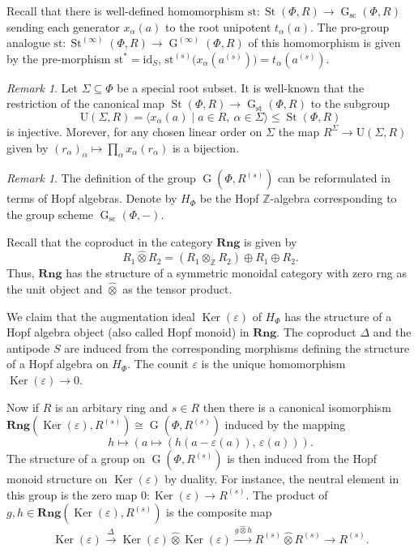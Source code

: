 \documentclass[oneside, 11pt]{amsart}
\numberwithin{equation}{section}
\theoremstyle{definition}
\theoremstyle{remark}
\newtheorem{rem}[lemma]{Remark}
\DeclareMathOperator\St{St}
\DeclareMathOperator\Ker{Ker}
\DeclareMathOperator\GG{G}
\newcommand{\Rng}{\mathbf{Rng}}
\newcommand{\ZZ}{\mathbb{Z}}
\newcommand{\otimeshat}{\mathbin{\widehat{\otimes}}}
\begin{document}
Recall that there is well-defined homomorphism $\mathrm{st}\colon \St(\Phi, R) \to \GG_{\mathrm{sc}}(\Phi, R)$ sending each generator $x_\alpha(a)$ to the root unipotent $t_\alpha(a)$. The pro-group analogue \(\mathrm{st} \colon \St^{(\infty)}(\Phi, R) \to \GG^{(\infty)}(\Phi, R)\) of this homomorphism is given by the pre-morphism \(\mathrm{st}^* = \mathrm{id}_S\), \(\mathrm{st}^{(s)}\bigl(x_{\alpha}(a^{(s)})\bigr) = t_\alpha(a^{(s)})\). 

\begin{rem}\label{rem:uni-rad}
Let $\Sigma \subseteq \Phi$ be a special root subset. It is well-known that the restriction of the canonical map $\St(\Phi, R)\to\GG_{\mathrm{st}}(\Phi, R)$ to the subgroup \[\mathrm{U}(\Sigma, R) = \langle x_{\alpha}(a) \mid a\in R,\ \alpha\in \Sigma \rangle \leq \St(\Phi, R)\] is injective. Morever, for any chosen linear order on \(\Sigma\) the map $R^{\Sigma} \to \mathrm{U}(\Sigma, R)$ given by $(r_\alpha)_\alpha \mapsto \prod_\alpha x_\alpha(r_\alpha)$ is a bijection. \end{rem}

\begin{rem}
 The definition of the group $\GG(\Phi, R^{(s)})$ can be reformulated in terms of Hopf algebras. Denote by \(H_\Phi\) be the Hopf \(\ZZ\)-algebra corresponding to the group scheme \(\GG_{\mathrm{sc}}(\Phi, -)\).
 
 Recall that the coproduct in the category $\Rng$ is given by \[R_1 \otimeshat R_2 = (R_1 \otimes_{\ZZ} R_2) \oplus R_1 \oplus R_2.\]
 Thus, $\Rng$ has the structure of a symmetric monoidal category with zero rng as the unit object and $\otimeshat$ as the tensor product.
 
 We claim that the augmentation ideal \(\Ker(\varepsilon)\) of $H_\Phi$ has the structure of a Hopf algebra object (also called Hopf monoid) in \(\Rng\). The coproduct $\Delta$ and the antipode $S$ are induced from the corresponding morphisms defining the structure of a Hopf algebra on $H_\Phi$. The counit $\varepsilon$ is the unique homomorphism $\Ker(\varepsilon) \to 0$.
 
 Now if $R$ is an arbitary ring and $s \in R$ then there is a canonical isomorphism \(\Rng(\Ker(\varepsilon), R^{(s)}) \cong \GG(\Phi, R^{(s)})\) induced by the mapping \[h \mapsto \left(a \mapsto \left(h(a - \varepsilon(a)),\, \varepsilon(a)\right)\right).\]
 The structure of a group on $\GG(\Phi, R^{(s)})$ is then induced from the Hopf monoid structure on $\Ker(\varepsilon)$ by duality.
 For instance, the neutral element in this group is the zero map \(0 \colon \Ker(\varepsilon) \to R^{(s)}\). The product of \(g, h \in \Rng(\Ker(\varepsilon), R^{(s)})\) is the composite map
 \[\Ker(\varepsilon) \xrightarrow{\Delta} \Ker(\varepsilon) \otimeshat \Ker(\varepsilon) \xrightarrow{g \otimeshat h} R^{(s)} \otimeshat R^{(s)} \to R^{(s)}.\]
\end{rem}
\end{document}
